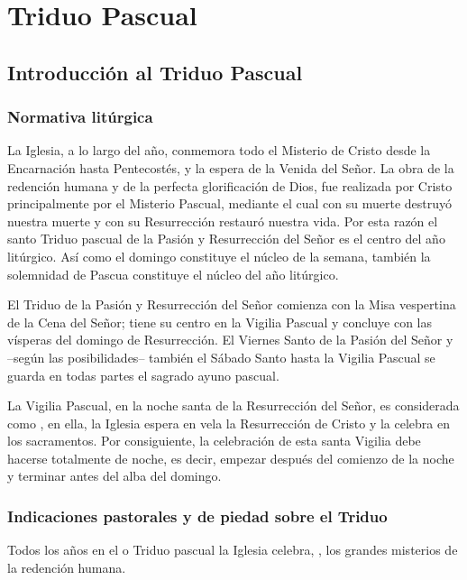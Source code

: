 			
\part{Triduo Pascual}

\chapter{Introducción al Triduo Pascual}
\begin{introstyle}
\section{Normativa litúrgica}

La Iglesia, a lo largo del año, conmemora todo el Misterio de Cristo desde la Encarnación hasta Pentecostés, y la espera de la Venida del Señor. La obra de la redención humana y de la perfecta glorificación de Dios, fue realizada por Cristo principalmente por el Misterio Pascual, mediante el cual con su muerte destruyó nuestra muerte y con su Resurrección restauró nuestra vida. Por esta razón el santo Triduo pascual de la Pasión y Resurrección del Señor es el centro del año litúrgico. Así como el domingo constituye el núcleo de la semana, también la solemnidad de Pascua constituye el núcleo del año litúrgico.

El Triduo de la Pasión y Resurrección del Señor comienza con la Misa vespertina de la Cena del Señor; tiene su centro en la Vigilia Pascual y concluye con las vísperas del domingo de Resurrección. El Viernes Santo de la Pasión del Señor y –según las posibilidades– también el Sábado Santo hasta la Vigilia Pascual se guarda en todas partes el sagrado ayuno pascual. 

La Vigilia Pascual, en la noche santa de la Resurrección del Señor, es considerada como , en ella, la Iglesia espera en vela la Resurrección de Cristo y la celebra en los sacramentos. Por consiguiente, la celebración de esta santa Vigilia debe hacerse totalmente de noche, es decir, empezar después del comienzo de la noche y terminar antes del alba del domingo. 

\section{Indicaciones pastorales y de piedad sobre el Triduo}

Todos los años en el  o Triduo pascual la Iglesia celebra, , los grandes misterios de la redención humana.


\end{introstyle}
